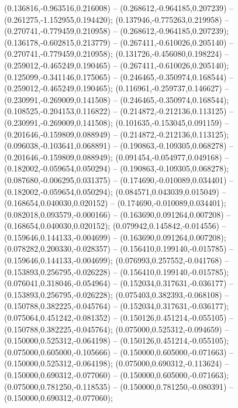  (0.136816,-0.963516,0.216008) -- (0.268612,-0.964185,0.207239) -- (0.261275,-1.152955,0.194420);
 (0.137946,-0.775263,0.219958) -- (0.270741,-0.779459,0.210958) -- (0.268612,-0.964185,0.207239);
 (0.136178,-0.602815,0.213779) -- (0.267411,-0.610026,0.205140) -- (0.270741,-0.779459,0.210958);
 (0.131726,-0.456080,0.198224) -- (0.259012,-0.465249,0.190465) -- (0.267411,-0.610026,0.205140);
 (0.125099,-0.341146,0.175065) -- (0.246465,-0.350974,0.168544) -- (0.259012,-0.465249,0.190465);
 (0.116961,-0.259737,0.146627) -- (0.230991,-0.269009,0.141508) -- (0.246465,-0.350974,0.168544);
 (0.108525,-0.204153,0.116822) -- (0.214872,-0.212136,0.113125) -- (0.230991,-0.269009,0.141508);
 (0.101635,-0.153045,0.091159) -- (0.201646,-0.159809,0.088949) -- (0.214872,-0.212136,0.113125);
 (0.096038,-0.103641,0.068891) -- (0.190863,-0.109305,0.068278) -- (0.201646,-0.159809,0.088949);
 (0.091454,-0.054977,0.049168) -- (0.182002,-0.059654,0.050294) -- (0.190863,-0.109305,0.068278);
 (0.087680,-0.006295,0.031375) -- (0.174690,-0.010089,0.034401) -- (0.182002,-0.059654,0.050294);
 (0.084571,0.043039,0.015049) -- (0.168654,0.040030,0.020152) -- (0.174690,-0.010089,0.034401);
 (0.082018,0.093579,-0.000166) -- (0.163690,0.091264,0.007208) -- (0.168654,0.040030,0.020152);
 (0.079942,0.145842,-0.014556) -- (0.159646,0.144133,-0.004699) -- (0.163690,0.091264,0.007208);
 (0.078282,0.200330,-0.028357) -- (0.156410,0.199140,-0.015785) -- (0.159646,0.144133,-0.004699);
 (0.076993,0.257552,-0.041768) -- (0.153893,0.256795,-0.026228) -- (0.156410,0.199140,-0.015785);
 (0.076041,0.318046,-0.054964) -- (0.152034,0.317631,-0.036177) -- (0.153893,0.256795,-0.026228);
 (0.075403,0.382393,-0.068108) -- (0.150788,0.382225,-0.045764) -- (0.152034,0.317631,-0.036177);
 (0.075064,0.451242,-0.081352) -- (0.150126,0.451214,-0.055105) -- (0.150788,0.382225,-0.045764);
 (0.075000,0.525312,-0.094659) -- (0.150000,0.525312,-0.064198) -- (0.150126,0.451214,-0.055105);
 (0.075000,0.605000,-0.105666) -- (0.150000,0.605000,-0.071663) -- (0.150000,0.525312,-0.064198);
 (0.075000,0.690312,-0.113624) -- (0.150000,0.690312,-0.077060) -- (0.150000,0.605000,-0.071663);
 (0.075000,0.781250,-0.118535) -- (0.150000,0.781250,-0.080391) -- (0.150000,0.690312,-0.077060);
